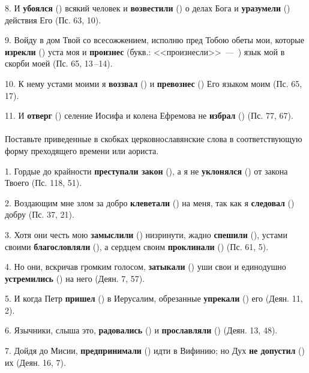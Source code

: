 \documentclass[11pt,a4paper,oneside]{memoir}
\newcommand{\exercise}{}
\begin{document}
8. И \textbf{убоялся} ({}) всякий человек и \textbf{возвестили} ({}) о делах Бога и \textbf{уразумели} ({}) действия Его (Пс. 63, 10).

9. Войду в дом Твой со всесожжением, исполню пред Тобою обеты мои, которые \textbf{изрекли} ({}) уста моя и \textbf{произнес} (букв.: <<произнесли>>~---~{}) язык мой в скорби моей (Пс. 65, 13\,--14).

10. К нему устами моими я \textbf{воззвал} ({}) и \textbf{превознес} ({}) Его языком моим (Пс. 65, 17).

11. И \textbf{отверг} ({}) селение Иосифа и колена Ефремова не \textbf{избрал} ({}) (Пс. 77, 67).

\paragraph{\exercise}

Поставьте приведенные в скобках церковнославянские слова в соответствующую форму преходящего времени или аориста.

1. Гордые до крайности \textbf{преступали закон} ({}), а я не \textbf{уклонялся} ({}) от закона Твоего (Пс. 118, 51).

2. Воздающим мне злом за добро \textbf{клеветали} ({}) на меня, так как я \textbf{следовал} ({}) добру (Пс. 37, 21).

3. Хотя они честь мою \textbf{замыслили} ({}) низринути, жадно \textbf{спешили} ({}), устами своими \textbf{благословляли} ({}), а сердцем своим \textbf{проклинали} ({}) (Пс. 61, 5).

4. Но они, вскричав громким голосом, \textbf{затыкали} ({}) уши свои и единодушно \textbf{устремились} ({}) на него (Деян. 7, 57).

5. И когда Петр \textbf{пришел} ({}) в Иерусалим, обрезанные \textbf{упрекали} ({}) его (Деян. 11, 2).

6. Язычники, слыша это, \textbf{радовались} ({}) и \textbf{прославляли} ({}) (Деян. 13, 48).

7. Дойдя до Мисии, \textbf{предпринимали} ({}) идти в Вифинию; но Дух \textbf{не допустил} ({}) их (Деян. 16, 7).
\end{document}
